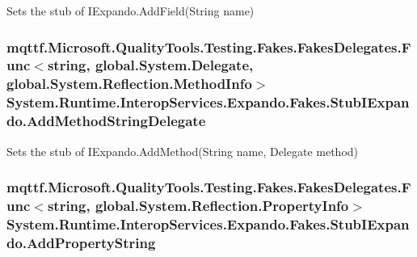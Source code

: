 Sets the stub of I\-Expando.\-Add\-Field(\-String name)

\hypertarget{class_system_1_1_runtime_1_1_interop_services_1_1_expando_1_1_fakes_1_1_stub_i_expando_a4e039bd23eb49e307fce63290de90d15}{
\subsubsection[{Add\-Method\-String\-Delegate}]{\setlength{\rightskip}{0pt plus 5cm}mqttf.\-Microsoft.\-Quality\-Tools.\-Testing.\-Fakes.\-Fakes\-Delegates.\-Func$<$string, global.\-System.\-Delegate, global.\-System.\-Reflection.\-Method\-Info$>$ System.\-Runtime.\-Interop\-Services.\-Expando.\-Fakes.\-Stub\-I\-Expando.\-Add\-Method\-String\-Delegate}}\label{class_system_1_1_runtime_1_1_interop_services_1_1_expando_1_1_fakes_1_1_stub_i_expando_a4e039bd23eb49e307fce63290de90d15}


Sets the stub of I\-Expando.\-Add\-Method(\-String name, Delegate method)

\hypertarget{class_system_1_1_runtime_1_1_interop_services_1_1_expando_1_1_fakes_1_1_stub_i_expando_a3f7cc4a2d70b19d0ebfa42752bfb54e8}{
\subsubsection[{Add\-Property\-String}]{\setlength{\rightskip}{0pt plus 5cm}mqttf.\-Microsoft.\-Quality\-Tools.\-Testing.\-Fakes.\-Fakes\-Delegates.\-Func$<$string, global.\-System.\-Reflection.\-Property\-Info$>$ System.\-Runtime.\-Interop\-Services.\-Expando.\-Fakes.\-Stub\-I\-Expando.\-Add\-Property\-String}}\label{class_system_1_1_runtime_1_1_interop_services_1_1_expando_1_1_fakes_1_1_stub_i_expando_a3f7cc4a2d70b19d0ebfa42752bfb54e8}


